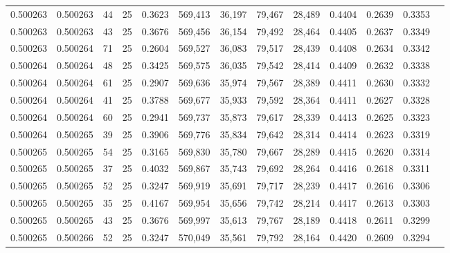 \begin{tabular}{rrrrrrrrrrrrr}
0.500263 & 0.500263 &    44 &  25 &                                     0.3623 & 569,413 &  36,197 &  79,467 &  28,489 & 0.4404 & 0.2639 & 0.3353 \\
0.500263 & 0.500263 &    43 &  25 &                                     0.3676 & 569,456 &  36,154 &  79,492 &  28,464 & 0.4405 & 0.2637 & 0.3349 \\
0.500263 & 0.500264 &    71 &  25 &                                     0.2604 & 569,527 &  36,083 &  79,517 &  28,439 & 0.4408 & 0.2634 & 0.3342 \\
0.500264 & 0.500264 &    48 &  25 &                                     0.3425 & 569,575 &  36,035 &  79,542 &  28,414 & 0.4409 & 0.2632 & 0.3338 \\
0.500264 & 0.500264 &    61 &  25 &                                     0.2907 & 569,636 &  35,974 &  79,567 &  28,389 & 0.4411 & 0.2630 & 0.3332 \\
0.500264 & 0.500264 &    41 &  25 &                                     0.3788 & 569,677 &  35,933 &  79,592 &  28,364 & 0.4411 & 0.2627 & 0.3328 \\
0.500264 & 0.500264 &    60 &  25 &                                     0.2941 & 569,737 &  35,873 &  79,617 &  28,339 & 0.4413 & 0.2625 & 0.3323 \\
0.500264 & 0.500265 &    39 &  25 &                                     0.3906 & 569,776 &  35,834 &  79,642 &  28,314 & 0.4414 & 0.2623 & 0.3319 \\
0.500265 & 0.500265 &    54 &  25 &                                     0.3165 & 569,830 &  35,780 &  79,667 &  28,289 & 0.4415 & 0.2620 & 0.3314 \\
0.500265 & 0.500265 &    37 &  25 &                                     0.4032 & 569,867 &  35,743 &  79,692 &  28,264 & 0.4416 & 0.2618 & 0.3311 \\
0.500265 & 0.500265 &    52 &  25 &                                     0.3247 & 569,919 &  35,691 &  79,717 &  28,239 & 0.4417 & 0.2616 & 0.3306 \\
0.500265 & 0.500265 &    35 &  25 &                                     0.4167 & 569,954 &  35,656 &  79,742 &  28,214 & 0.4417 & 0.2613 & 0.3303 \\
0.500265 & 0.500265 &    43 &  25 &                                     0.3676 & 569,997 &  35,613 &  79,767 &  28,189 & 0.4418 & 0.2611 & 0.3299 \\
0.500265 & 0.500266 &    52 &  25 &                                     0.3247 & 570,049 &  35,561 &  79,792 &  28,164 & 0.4420 & 0.2609 & 0.3294 \\

\end{tabular}
